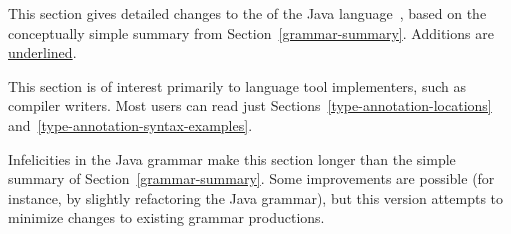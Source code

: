 \documentclass[10pt]{article}
\begin{document}
This section
gives detailed changes to the  of the Java
language~\cite[ch.~18]{GoslingJSB2005}, based on the conceptually
simple summary from Section~\ref{grammar-summary}. 
Additions are \underline{underlined}.

This section is of interest primarily to language tool implementers, such
as compiler writers.  Most users can read just
Sections~\ref{type-annotation-locations} and~\ref{type-annotation-syntax-examples}.

Infelicities in the Java grammar make this section longer than the simple
summary of Section~\ref{grammar-summary}.  Some improvements are
possible (for instance, by slightly refactoring the Java grammar), but this
version attempts to minimize changes to existing grammar productions.
\end{document}
